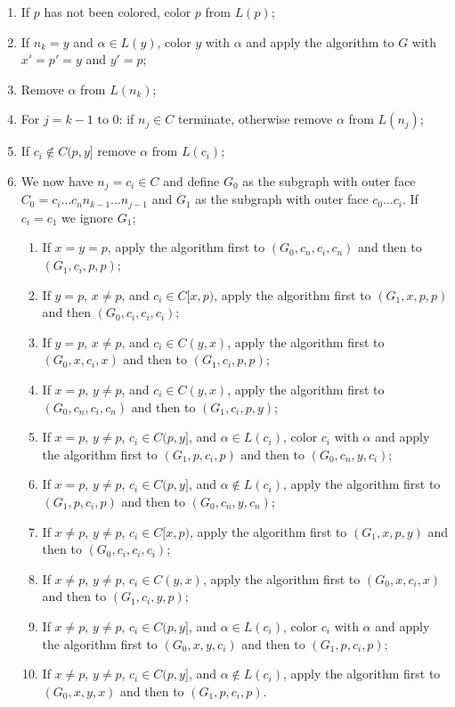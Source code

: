 \documentclass[11pt,letter]{article}
\begin{document}
\begin{enumerate}
\item If $p$ has not been colored, color $p$ from $L(p)$;
\item If $n_k=y$ and $\alpha\in L(y)$, color $y$ with $\alpha$ and apply the algorithm to $G$ with $x'=p'=y$ and
$y'=p$;
\item Remove $\alpha$ from $L(n_k)$;
\item For $j=k-1$ to $0$: if $n_j\in C$ terminate, otherwise remove $\alpha$ from $L(n_j)$;
\item If $c_i\not\in C(p,y]$ remove $\alpha$ from $L(c_i)$;
\item We now have $n_j=c_i\in C$ and define $G_0$ as the subgraph with outer face
$C_0=c_i\ldots c_nn_{k-1}\ldots n_{j-1}$ and $G_1$ as the subgraph with outer face $c_0\ldots c_i$. If $c_i=c_1$
we ignore $G_1$;
\begin{enumerate}
\item If $x=y=p$, apply the algorithm first to $(G_0, c_n, c_i, c_n)$ and then to $(G_1, c_i, p, p)$;
\item If $y=p$, $x\ne p$, and $c_i\in C[x,p)$, apply the algorithm first to $(G_1, x, p, p)$ and then
$(G_0, c_i, c_i, c_i)$;
\item If $y=p$, $x\ne p$, and $c_i\in C(y,x)$, apply the algorithm first to $(G_0, x, c_i, x)$ and then to $(G_1, c_i, p, p)$;
\item If $x=p$, $y\ne p$, and $c_i\in C(y,x)$, apply the algorithm first to $(G_0, c_n, c_i, c_n)$ and then to $(G_1, c_i, p, y)$;
\item If $x=p$, $y\ne p$, $c_i\in C(p,y]$, and $\alpha\in L(c_i)$, color $c_i$ with $\alpha$ and apply the
algorithm first to $(G_1, p, c_i, p)$ and then to $(G_0, c_n, y, c_i)$;
\item If $x=p$, $y\ne p$, $c_i\in C(p,y]$, and $\alpha\not\in L(c_i)$, apply the
algorithm first to $(G_1, p, c_i, p)$ and then to $(G_0, c_n, y, c_n)$;
\item If $x\ne p$, $y\ne p$, $c_i\in C[x,p)$, apply the algorithm first to $(G_1, x, p, y)$ and then to
$(G_0, c_i, c_i, c_i)$;
\item If $x\ne p$, $y\ne p$, $c_i\in C(y,x)$, apply the algorithm first to $(G_0, x, c_i, x)$ and then to
$(G_1, c_i, y, p)$;
\item If $x\ne p$, $y\ne p$, $c_i\in C(p,y]$, and $\alpha\in L(c_i)$, color $c_i$ with $\alpha$ and apply the
algorithm first to $(G_0, x, y, c_i)$ and then to $(G_1, p, c_i, p)$;
\item If $x\ne p$, $y\ne p$, $c_i\in C(p,y]$, and $\alpha\not\in L(c_i)$, apply the
algorithm first to $(G_0, x, y, x)$ and then to $(G_1, p, c_i, p)$.
\end{enumerate}
\end{enumerate}
\end{document}
